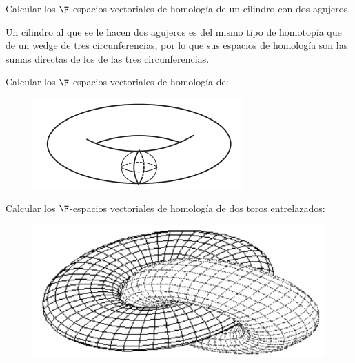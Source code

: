 \documentclass[twoside]{article}
\begin{document}
\newpage

\begin{ejercicio}{2.19}
Calcular los $\F$-espacios vectoriales de homología de un cilindro con dos
agujeros.
\end{ejercicio}
\begin{solucion}
Un cilindro al que se le hacen dos agujeros es del mismo tipo de homotopía que de un wedge de tres circunferencias, por lo que sus espacios de homología son las sumas directas de los de las tres circunferencias.
\end{solucion}

\newpage

\begin{ejercicio}{2.20}
Calcular los $\F$-espacios vectoriales de homología de:

\begin{figure}[h!]
\centering
\includegraphics[scale=0.7]{toro1}
\end{figure}
\end{ejercicio}
\begin{solucion}
\end{solucion}

\newpage

\begin{ejercicio}{2.21}
Calcular los $\F$-espacios vectoriales de homología de dos toros entrelazados:

\begin{figure}[h!]
\centering
\includegraphics[scale=0.5]{toro2}
\end{figure}
\end{ejercicio}
\end{document}
